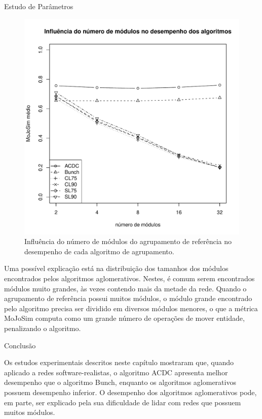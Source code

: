 \begin{section}{Estudo de Parâmetros}
\begin{figure}[htbp]
	\centering
		\includegraphics[scale=0.5]{figuras/mojosim-vs-modules}
	\caption{Influência do número de módulos do agrupamento de referência no desempenho de cada algoritmo de agrupamento.}
	\label{fig:mojosim-vs-modules}
\end{figure}

Uma possível explicação está na distribuição dos tamanhos dos módulos encontrados pelos algoritmos aglomerativos. Nestes, é comum serem encontrados módulos muito grandes, às vezes contendo mais da metade da rede. Quando o agrupamento de referência possui muitos módulos, o módulo grande encontrado pelo algoritmo precisa ser dividido em diversos módulos menores, o que a métrica MoJoSim computa como um grande número de operações de mover entidade, penalizando o algoritmo.


\end{section}

\begin{section}{Conclusão}

Os estudos experimentais descritos neste capítulo mostraram que, quando aplicado a redes software-realistas, o algoritmo ACDC apresenta melhor desempenho que o algoritmo Bunch, enquanto os algoritmos aglomerativos possuem desempenho inferior. O desempenho dos algoritmos aglomerativos pode, em parte, ser explicado pela sua dificuldade de lidar com redes que possuem muitos módulos. 

\end{section}
